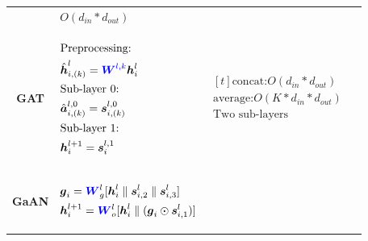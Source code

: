 \begin{table}
\begin{footnotesize}
\begin{tabular}{cp{20em}r}
			                                                                                                                                                                                                                 &
			$O(d_{in} * d_{out})$                                                                                                                                                                                              \\
			\textbf{GAT} &
            \begin{scriptsize}
                $\begin{aligned}[t]
                & \text{Preprocessing:}\\
                & \hat{\boldsymbol{h}}^{l}_{i,(k)} = \textcolor{blue}{\boldsymbol{W}^{l,k}} \boldsymbol{h}_i^{l}\\
                & \text{Sub-layer 0:}\\
                & \hat{\boldsymbol{a}}^{l,0}_{i,(k)} = \boldsymbol{s}^{l,0}_{i,(k)}\\
                & \text{Sub-layer 1:}\\
                & \boldsymbol{h}_i^{l+1} = \boldsymbol{s}_i^{l,1}
                \end{aligned}
                $
            \end{scriptsize} &
             $
             \begin{aligned}[t]
             \text{concat:} O(d_{in}*d_{out}) &\\
             \text{average:} O(K*d_{in}*d_{out}) &\\
             \text{Two sub-layers}&
            \end{aligned}
             $
           \\
			\textbf{GaAN}                                                                                                                                                                                                    &
			\begin{scriptsize}
				$\begin{aligned}[t]
						 & \boldsymbol{g}_i = \textcolor{blue}{\boldsymbol{W}}^l_g  [\boldsymbol{h}_i^{l} \parallel \boldsymbol{s}_{i, 2}^l \parallel \boldsymbol{s}_{i, 3}^l] \\
						 & \boldsymbol{h}_i^{l+1} = \textcolor{blue}{\boldsymbol{W}}^l_o [\boldsymbol{h}_i^l \parallel (\boldsymbol{g}_{i} \odot \boldsymbol{s}_{i, 1}^l) ]
					\end{aligned}$
			\end{scriptsize}                                                                                                                                                                                   &

\end{tabular}
\end{footnotesize}
\end{table}
